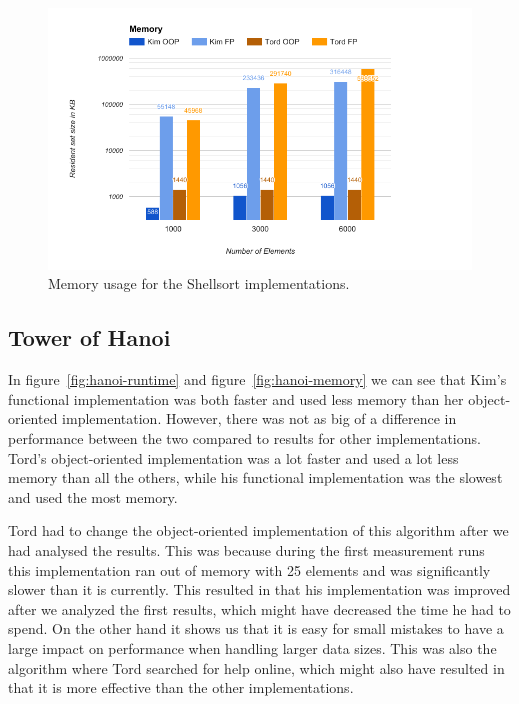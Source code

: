 \documentclass {article}
\begin{document}
\begin{figure}[H]
\centering
\includegraphics[width=\textwidth]{shellsort-memory}

\caption{Memory usage for the Shellsort implementations.}
\label{fig:shellsort-memory}
\end{figure}
\subsection{Tower of Hanoi}
In figure~\ref{fig:hanoi-runtime} and figure~\ref{fig:hanoi-memory} we can see that Kim's functional implementation was both faster and used less memory than her object-oriented implementation. However, there was not as big of a difference in performance between the two compared to results for other implementations. Tord's object-oriented implementation was a lot faster and used a lot less memory than all the others, while his functional implementation was the slowest and used the most memory.
 
Tord had to change the object-oriented implementation of this algorithm after we had analysed the results. This was because during the first measurement runs this implementation ran out of memory with 25 elements and was significantly slower than it is currently. This resulted in that his implementation was improved after we analyzed the first results, which might have decreased the time he had to spend. On the other hand it shows us that it is easy for small mistakes to have a large impact on performance when handling larger data sizes. This was also the algorithm where Tord searched for help online, which might also have resulted in that it is more effective than the other implementations.
 
\end{document}
